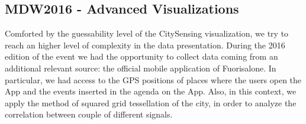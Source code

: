 \subsection{MDW2016 - Advanced Visualizations} \label{sec:cs-mdw-2016}
Comforted by the guessability level of the CitySensing visualization, we try to reach an higher level of complexity in the data presentation.
During the 2016 edition of the event we had the opportunity to collect data coming from an additional relevant source: the official mobile application of Fuorisalone. In particular, we had access to the GPS positions of \textsf{place}s where the users open the App and the \textsf{event}s inserted in the agenda on the App. Also, in this context, we apply the method of squared \textsf{grid} tessellation of the city, in order to analyze the correlation between couple of different signals.

